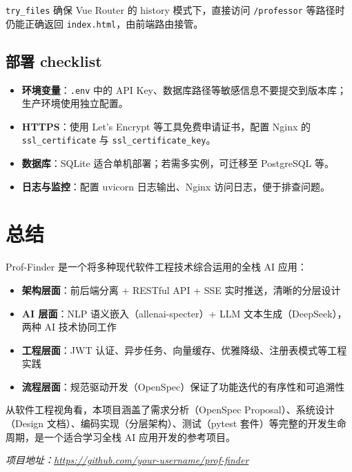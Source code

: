 \documentclass[11pt]{article}
\begin{document}
\texttt{try\_files} 确保 Vue Router 的 history 模式下，直接访问 \texttt{/professor} 等路径时仍能正确返回 \texttt{index.html}，由前端路由接管。

\subsection{部署 checklist}

\begin{itemize}
    \item \textbf{环境变量}：\texttt{.env} 中的 API Key、数据库路径等敏感信息不要提交到版本库；生产环境使用独立配置。
    \item \textbf{HTTPS}：使用 Let's Encrypt 等工具免费申请证书，配置 Nginx 的 \texttt{ssl\_certificate} 与 \texttt{ssl\_certificate\_key}。
    \item \textbf{数据库}：SQLite 适合单机部署；若需多实例，可迁移至 PostgreSQL 等。
    \item \textbf{日志与监控}：配置 uvicorn 日志输出、Nginx 访问日志，便于排查问题。
\end{itemize}

\section{总结}

Prof-Finder 是一个将多种现代软件工程技术综合运用的全栈 AI 应用：

\begin{itemize}
    \item \textbf{架构层面}：前后端分离 + RESTful API + SSE 实时推送，清晰的分层设计
    \item \textbf{AI 层面}：NLP 语义嵌入（allenai-specter）+ LLM 文本生成（DeepSeek），两种 AI 技术协同工作
    \item \textbf{工程层面}：JWT 认证、异步任务、向量缓存、优雅降级、注册表模式等工程实践
    \item \textbf{流程层面}：规范驱动开发（OpenSpec）保证了功能迭代的有序性和可追溯性
\end{itemize}

从软件工程视角看，本项目涵盖了需求分析（OpenSpec Proposal）、系统设计（Design 文档）、编码实现（分层架构）、测试（pytest 套件）等完整的开发生命周期，是一个适合学习全栈 AI 应用开发的参考项目。

\vspace{1em}
\begin{center}
\textit{项目地址：\url{https://github.com/your-username/prof-finder}}
\end{center}
\end{document}
